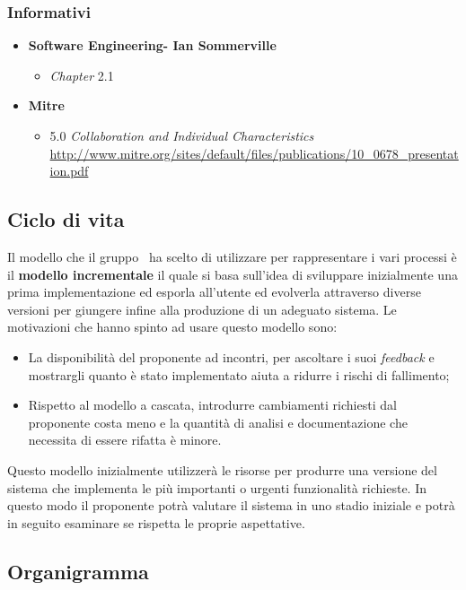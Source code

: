 \subsubsection{Informativi}
\begin{itemize}
\item \textbf{Software Engineering- Ian Sommerville}
	\begin{itemize}
	\item \textit{Chapter} 2.1
	\end{itemize}
\item \textbf{Mitre}
	\begin{itemize} 
	\item 5.0 \textit{Collaboration and Individual Characteristics} \url{http://www.mitre.org/sites/default/files/publications/10_0678_presentation.pdf}
	\end{itemize}
\end{itemize}
\subsection{Ciclo di vita}
\label{subsec:ciclodivita}
Il modello che il gruppo \gruppo ~ha scelto di utilizzare per rappresentare i vari processi è il \textbf{modello incrementale} il quale si basa sull'idea di sviluppare inizialmente una prima implementazione ed esporla all'utente ed evolverla attraverso diverse versioni per giungere infine alla produzione di un adeguato sistema. Le motivazioni che hanno spinto ad usare questo modello sono:
\begin{itemize}
	\item La disponibilità del proponente ad incontri, per ascoltare i suoi \textit{feedback} e mostrargli quanto è stato implementato aiuta a ridurre i rischi di fallimento;
	\item Rispetto al modello a cascata, introdurre cambiamenti richiesti dal proponente costa meno e la quantità di analisi e documentazione che necessita di essere rifatta è minore.
\end{itemize}
Questo modello inizialmente utilizzerà le risorse per produrre una versione del sistema che implementa le più importanti o urgenti funzionalità richieste. In questo modo il proponente potrà valutare il sistema in uno stadio iniziale e potrà in seguito esaminare se rispetta le proprie aspettative.

\subsection{Organigramma}
